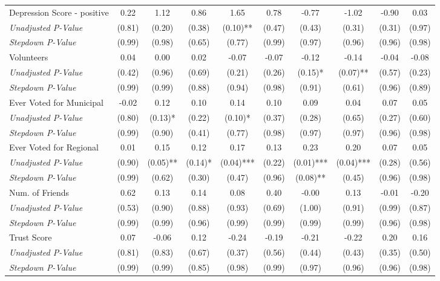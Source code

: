 \begin{tabular}{l c c c c c c c c c}
Depression Score - positive & 0.22 & 1.12 & 0.86 & 1.65 & 0.78 & -0.77 & -1.02 & -0.90 & 0.03 \\
\quad \textit{Unadjusted P-Value} & (0.81) & (0.20) & (0.38) & (0.10)** & (0.47) & (0.43) & (0.31) & (0.31) & (0.97) \\
\quad \textit{Stepdown P-Value} & (0.99) & (0.98) & (0.65) & (0.77) & (0.99) & (0.97) & (0.96) & (0.96) & (0.98) \\
Volunteers & 0.04 & 0.00 & 0.02 & -0.07 & -0.07 & -0.12 & -0.14 & -0.04 & -0.08 \\
\quad \textit{Unadjusted P-Value} & (0.42) & (0.96) & (0.69) & (0.21) & (0.26) & (0.15)* & (0.07)** & (0.57) & (0.23) \\
\quad \textit{Stepdown P-Value} & (0.99) & (0.99) & (0.88) & (0.94) & (0.98) & (0.91) & (0.61) & (0.96) & (0.89) \\
Ever Voted for Municipal & -0.02 & 0.12 & 0.10 & 0.14 & 0.10 & 0.09 & 0.04 & 0.07 & 0.05 \\
\quad \textit{Unadjusted P-Value} & (0.80) & (0.13)* & (0.22) & (0.10)* & (0.37) & (0.28) & (0.65) & (0.27) & (0.60) \\
\quad \textit{Stepdown P-Value} & (0.99) & (0.90) & (0.41) & (0.77) & (0.98) & (0.97) & (0.97) & (0.96) & (0.98) \\
Ever Voted for Regional & 0.01 & 0.15 & 0.12 & 0.17 & 0.13 & 0.23 & 0.20 & 0.07 & 0.05 \\
\quad \textit{Unadjusted P-Value} & (0.90) & (0.05)** & (0.14)* & (0.04)*** & (0.22) & (0.01)*** & (0.04)*** & (0.28) & (0.56) \\
\quad \textit{Stepdown P-Value} & (0.99) & (0.62) & (0.30) & (0.47) & (0.96) & (0.08)** & (0.45) & (0.96) & (0.98) \\
Num. of Friends & 0.62 & 0.13 & 0.14 & 0.08 & 0.40 & -0.00 & 0.13 & -0.01 & -0.20 \\
\quad \textit{Unadjusted P-Value} & (0.53) & (0.90) & (0.88) & (0.93) & (0.69) & (1.00) & (0.91) & (0.99) & (0.87) \\
\quad \textit{Stepdown P-Value} & (0.99) & (0.99) & (0.96) & (0.99) & (0.99) & (0.99) & (0.99) & (0.96) & (0.98) \\
Trust Score & 0.07 & -0.06 & 0.12 & -0.24 & -0.19 & -0.21 & -0.22 & 0.20 & 0.16 \\
\quad \textit{Unadjusted P-Value} & (0.81) & (0.83) & (0.67) & (0.37) & (0.56) & (0.44) & (0.43) & (0.35) & (0.50) \\
\quad \textit{Stepdown P-Value} & (0.99) & (0.99) & (0.85) & (0.98) & (0.99) & (0.97) & (0.96) & (0.96) & (0.98) \\
\bottomrule
\end{tabular}
